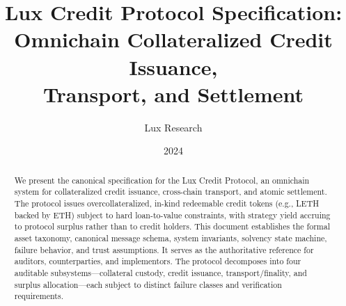 \documentclass[11pt,twocolumn]{article}
\title{Lux Credit Protocol Specification:\\Omnichain Collateralized Credit Issuance,\\Transport, and Settlement}
\author{Lux Research}
\date{2024}
\theoremstyle{remark}
\begin{document}
\luxcoverpage

\maketitle

\begin{abstract}
We present the canonical specification for the Lux Credit Protocol, an omnichain system for collateralized credit issuance, cross-chain transport, and atomic settlement. The protocol issues overcollateralized, in-kind redeemable credit tokens (e.g., LETH backed by ETH) subject to hard loan-to-value constraints, with strategy yield accruing to protocol surplus rather than to credit holders. This document establishes the formal asset taxonomy, canonical message schema, system invariants, solvency state machine, failure behavior, and trust assumptions. It serves as the authoritative reference for auditors, counterparties, and implementors. The protocol decomposes into four auditable subsystems---collateral custody, credit issuance, transport/finality, and surplus allocation---each subject to distinct failure classes and verification requirements.
\end{abstract}













\end{document}
